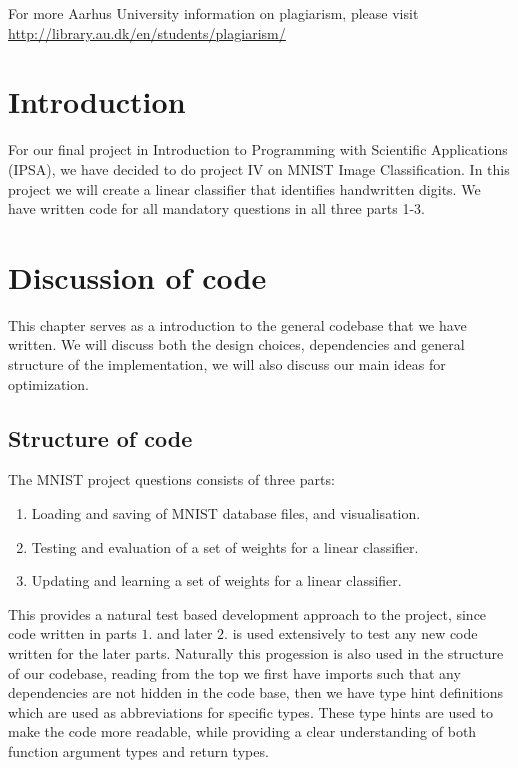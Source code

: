 \documentclass[a4paper,oneside,article,english]{memoir}
\begin{document}
\begin{raggedleft}
For more Aarhus University information on plagiarism, please visit\newline
\underline{\url{http://library.au.dk/en/students/plagiarism/}} 
\end{raggedleft}
\newpage



\chapter{Introduction}  
\label{ch:introduction}

For our final project in Introduction to Programming with Scientific
Applications (IPSA), we have decided to do project IV on MNIST Image
Classification. In this project we will create a linear classifier that
identifies handwritten digits. We have written code for all mandatory questions in all three
parts 1-3.



\chapter{Discussion of code}  
\label{ch:structure_of_code}
This chapter serves as a introduction to the general codebase that we have
written. We will discuss both the design choices, dependencies and general
structure of the implementation, we will also discuss our main ideas for optimization.

\section{Structure of code}  
\label{sec:structure_of_code}

The MNIST project questions consists of three parts:
\begin{enumerate}
  \item Loading and saving of MNIST database files, and visualisation.
  \item Testing and evaluation of a set of weights for a linear classifier.
  \item Updating and learning a set of weights for a linear classifier.
\end{enumerate}
This provides a natural test based development approach to the project, since
code written in parts $1.$ and later $2.$ is used extensively to test any new
code written for the later parts. Naturally this progession is also used in the
structure of our codebase, reading from the top we first have imports such that
any dependencies are not hidden in the code base, then we have type hint
definitions which are used as abbreviations for specific types. These type hints
are used to make the code more readable, while providing a clear understanding
of both function argument types and return types. 
\end{document}
